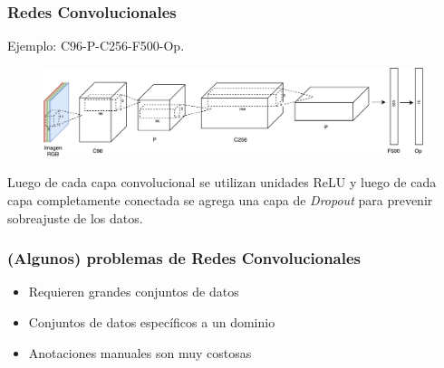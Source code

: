 \documentclass{beamer}
\begin{document}
\begin{frame}
\frametitle{Redes Convolucionales}
Ejemplo: C96-P-C256-F500-Op.
\vfill
\begin{figure}
    \centering
    \includegraphics[width=\textwidth]{images/net_example.pdf}
\end{figure}
\vfill
Luego de cada capa convolucional se utilizan unidades ReLU y luego de cada capa completamente conectada se agrega una capa de \textit{Dropout} para prevenir sobreajuste de los datos.
\vfill
\end{frame}




\begin{frame}
\frametitle{(Algunos) problemas de Redes Convolucionales}
\begin{itemize}
    \item Requieren grandes conjuntos de datos
    \item Conjuntos de datos específicos a un dominio
    \item Anotaciones manuales son muy costosas
\end{itemize}
\end{frame}
\end{document}
